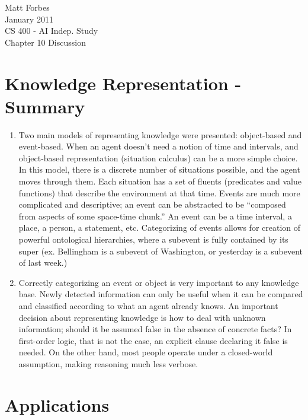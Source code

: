 \documentclass[a4paper,12pt]{article}
\begin{document}
Matt Forbes \\
January 2011 \\
CS 400 - AI Indep. Study \\
Chapter 10 Discussion

\section*{Knowledge Representation - Summary}

\begin{enumerate}[]
\item Two main models of representing knowledge were presented:
  object-based and event-based. When an agent doesn't need a notion of
  time and intervals, and object-based representation (situation
  calculus) can be a more simple choice. In this model, there is a
  discrete number of situations possible, and the agent moves through
  them. Each situation has a set of fluents (predicates and value
  functions) that describe the environment at that time. Events are
  much more complicated and descriptive; an event can be abstracted to
  be ``composed from aspects of some space-time chunk.'' An event can
  be a time interval, a place, a person, a statement,
  etc. Categorizing of events allows for creation of powerful
  ontological hierarchies, where a subevent is fully contained by its
  super (ex. Bellingham is a subevent of Washington, or yesterday is a
  subevent of last week.)

\item Correctly categorizing an event or object is very important to
  any knowledge base. Newly detected information can only be useful
  when it can be compared and classified according to what an agent
  already knows. An important decision about representing knowledge is
  how to deal with unknown information; should it be assumed false in
  the absence of concrete facts? In first-order logic, that is not the
  case, an explicit clause declaring it false is needed. On the other
  hand, most people operate under a closed-world assumption, making
  reasoning much less verbose.
\end{enumerate}

\section*{Applications}
  
\end{document}
